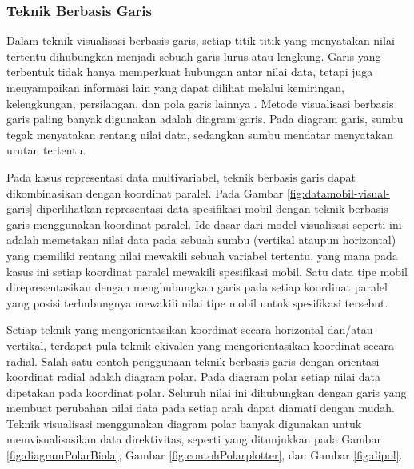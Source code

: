 \subsubsection{Teknik Berbasis Garis}
Dalam teknik visualisasi berbasis garis, setiap titik-titik yang menyatakan nilai tertentu dihubungkan menjadi sebuah garis lurus atau lengkung. Garis yang terbentuk tidak hanya memperkuat hubungan antar nilai data, tetapi juga menyampaikan informasi lain yang dapat dilihat melalui kemiringan, kelengkungan, persilangan, dan pola garis lainnya \cite{buku_visual}. Metode visualisasi berbasis garis paling banyak digunakan adalah diagram garis. Pada diagram garis, sumbu tegak menyatakan rentang nilai data, sedangkan sumbu mendatar menyatakan urutan tertentu. \par 
Pada kasus representasi data multivariabel, teknik berbasis garis dapat dikombinasikan dengan koordinat paralel. Pada Gambar \ref{fig:datamobil-visual-garis} diperlihatkan representasi data spesifikasi mobil dengan teknik berbasis garis menggunakan koordinat paralel. Ide dasar dari model visualisasi seperti ini adalah memetakan nilai data pada sebuah sumbu (vertikal ataupun horizontal) yang memiliki rentang nilai mewakili sebuah variabel tertentu, yang mana pada kasus ini setiap koordinat paralel mewakili spesifikasi mobil. Satu data tipe mobil direpresentasikan dengan menghubungkan garis pada setiap koordinat paralel yang posisi terhubungnya mewakili nilai tipe mobil untuk spesifikasi tersebut. \par  
Setiap teknik yang mengorientasikan koordinat secara horizontal dan/atau vertikal, terdapat pula teknik ekivalen yang mengorientasikan koordinat secara radial. Salah satu contoh penggunaan teknik berbasis garis dengan orientasi koordinat radial adalah diagram polar. Pada diagram polar setiap nilai data dipetakan pada koordinat polar. Seluruh nilai ini dihubungkan dengan garis yang membuat perubahan nilai data pada setiap arah dapat diamati dengan mudah. Teknik visualisasi menggunakan diagram polar banyak digunakan untuk memvisualisasikan data direktivitas, seperti yang ditunjukkan pada Gambar \ref{fig:diagramPolarBiola}, Gambar \ref{fig:contohPolarplotter}, dan Gambar \ref{fig:dipol}. \par
